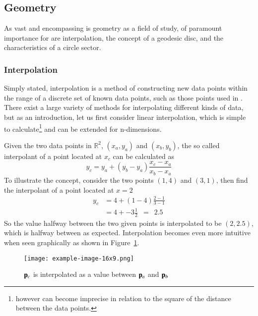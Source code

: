 \subsection{Geometry}
As vast and encompassing is geometry as a field of study, of paramount importance for  are interpolation, the concept of a geodesic disc, and the characteristics of a circle sector.
%
\subsubsection{Interpolation}
Simply stated, interpolation is a method of constructing new data points within the range of a discrete set of known data points, such as those points used in \tdd{}. There exist a large variety of methods for interpolating different kinds of data, but as an introduction, let us first consider linear interpolation, which is simple to calculate\footnote{however can become imprecise in relation to the square of the distance between the data points.} and can be extended for n-dimensions.

Given the two data points in $\mathbb{R}^2$, $(x_a, y_a)$ and $(x_b, y_b)$, the so called interpolant of a point located at $x_c$ can be calculated as
\begin{equation}
	y_c = y_a + (y_b - y_a) \frac{x_c - x_a}{x_b - x_a}
	\label{eq:interpolationGeneral}
\end{equation}
To illustrate the concept, consider the two points $(1, 4)$ and $(3, 1)$, then find the interpolant of a point located at $x = 2$
\begin{align}
	y_c & = 4 + (1 - 4) \frac{2 - 1}{3 - 1} \\
	& = 4 + -3 \frac{1}{2} \enspace = \enspace  2.5	
	\label{eq:interpolationSpecific}
\end{align}
So the value halfway between the two given points is interpolated to be $(2, 2.5)$, which is halfway between as expected. Interpolation becomes even more intuitive when seen graphically as shown in Figure~\ref{fig:interpolation}.
\begin{figure}
\ffigbox
	{\texttt{[image: example-image-16x9.png]}}
	{\caption[Interpolation between two points in $\mathbb{R}^2$]{$\mathbf{p}_c$ is interpolated as a value between $\mathbf{p}_a$ and $\mathbf{p}_b$}\label{fig:interpolation}}
\end{figure}
%
